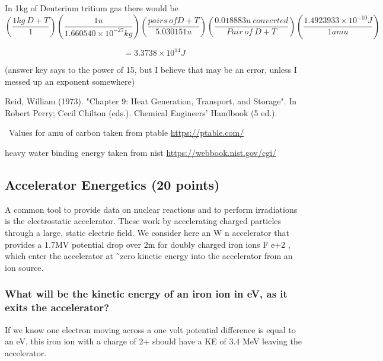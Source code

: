 \documentclass{article}
\begin{document}
In 1kg of Deuterium tritium gas there would be \vspace{10pt}
$$\left(\frac{1kg \ D+T}{1}\right)\left(\frac{1u}{1.660540\times 10^{-27}kg}\right)\left(\frac{pairs \ of D+T}{5.030151u}\right)\left(\frac{0.018883u \ converted}{Pair \ of \ D+T}\right)\left(\frac{1.4923933\times10^{-10} J}{1 amu}\right)$$\vspace{10pt}

$$=3.3738 \times 10^{14} J$$

(answer key says to the power of 15, but I believe that may be an error, unless I messed up an exponent somewhere)\vspace{10pt}





 Reid, William (1973). "Chapter 9: Heat Generation, Transport, and Storage". In Robert Perry; Cecil Chilton (eds.). Chemical Engineers' Handbook (5 ed.).\vspace{10pt}

 \
Values for amu of carbon taken from ptable \href{https://ptable.com/}{https://ptable.com/}

\vspace{10pt}

heavy water binding energy taken from nist 
\href{https://webbook.nist.gov/cgi/cbook.cgi?ID=C7789200&Mask=6F}{https://webbook.nist.gov/cgi/}
\subsection{Accelerator Energetics (20 points)}
A common tool to provide data on nuclear reactions and to perform irradiations is the electrostatic accelerator. These work by accelerating charged particles through a large, static electric field. We consider here an
W n accelerator that provides a 1.7MV potential drop over 2m for doubly charged iron ions F e+2 , which enter
the accelerator at ˜zero kinetic energy into the accelerator from an ion source.\vspace{10pt}




\subsubsection{What will be the kinetic energy of an iron ion in eV, as it exits the accelerator?}

If we know one electron moving across a one volt potential difference is equal to an eV, this iron ion with a charge of 2+ should have a KE of 3.4 MeV leaving the accelerator.
\end{document}

